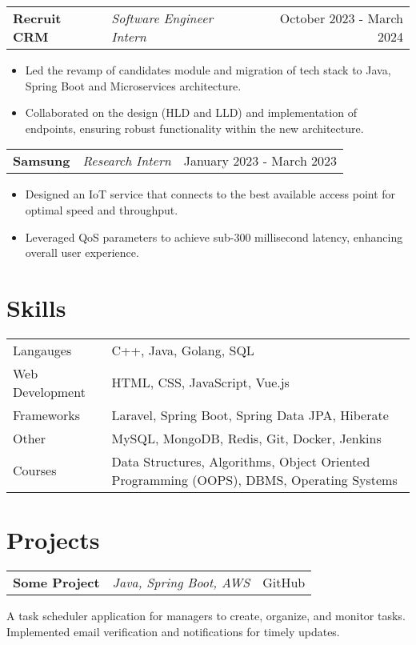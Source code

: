 \documentclass[a4paper,10pt]{article}
\makeatletter
\newenvironment{jobshort}[3]
    {
    \begin{tabularx}{\linewidth}{@{}l X r@{}}
    \textbf{#1} & \textit{#2} &  #3 \\[3pt]
    \end{tabularx}
    }
    {
    }
\newenvironment{joblong}[3]
    {
    \begin{tabularx}{\linewidth}{@{}l X r@{}}
    \textbf{#1} & \textit{#2} &  #3 \\[3pt]
    \end{tabularx}
    \begin{minipage}[t]{\linewidth}
    \begin{itemize}[nosep,after=\strut, leftmargin=1em, itemsep=2pt,label=--]
    }
    {
    \end{itemize}
    \end{minipage}    
    }
\makeatother
\begin{document}
\begin{joblong}{Recruit CRM}{Software Engineer Intern}{October 2023 - March 2024}
    \item Led the revamp of candidates module and migration of tech stack to Java, Spring Boot and Microservices architecture.
    \item Collaborated on the design (HLD and LLD) and implementation of endpoints, ensuring robust functionality within the
    new architecture.
    \end{joblong}

\begin{joblong}{Samsung}{Research Intern}{January 2023 - March 2023}
    \item Designed an IoT service that connects to the best available access point for optimal speed and throughput.
    \item Leveraged QoS parameters to achieve sub-300 millisecond latency, enhancing overall user experience.
\end{joblong}
\vspace{-5pt}

\section{Skills}
\vspace{-5pt}
\begin{tabularx}{\linewidth}{@{}l X@{}}
Langauges &  \normalsize{C++, Java, Golang, SQL}\\
Web Development & \normalsize{HTML, CSS, JavaScript, Vue.js}\\
Frameworks &  \normalsize{Laravel, Spring Boot, Spring Data JPA, Hiberate}\\
Other & \normalsize{MySQL, MongoDB, Redis, Git, Docker, Jenkins}\\
Courses & Data Structures, Algorithms, Object Oriented Programming (OOPS), DBMS, Operating Systems
\end{tabularx}
\vspace{-5pt}


  
\section{Projects}
\vspace{-5pt}
\begin{jobshort}{Some Project}{Java, Spring Boot, AWS}{GitHub}
    A task scheduler application for managers to create, organize, and monitor tasks. Implemented email verification and
notifications for timely updates.
\end{jobshort}
\end{document}
